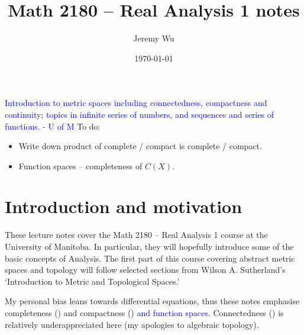\documentclass[12pt]{book}
\title{Math 2180 -- Real Analysis 1 notes}
\author{Jeremy Wu}
\date{\today}
\theoremstyle{remark}
\theoremstyle{definition}
\begin{document}
	\maketitle
	
	\textcolor{blue}{Introduction to metric spaces including connectedness, compactness and continuity; topics in infinite series of numbers, and sequences and series of functions. - U of M}
	To do:
	\begin{itemize}
		\item Write down product of complete / compact is complete / compact.
		\item Function spaces -- completeness of $C(X)$.
	\end{itemize}
	
	\tableofcontents
	
	\pagestyle{fancy}
	\section{Introduction and motivation}
	\label{sec:intro}
	These lecture notes cover the Math 2180 -- Real Analysis 1 course at the University of Manitoba. In particular, they will hopefully introduce some of the basic concepts of Analysis. The first part of this course covering abstract metric spaces and topology will follow selected sections from Wilson A. Sutherland's `Introduction to Metric and Topological Spaces.'
	
	My personal bias leans towards differential equations, thus these notes emphasise completeness () and compactness () \textcolor{blue}{and function spaces}. Connectedness () is relatively underappreciated here (my apologies to algebraic topology).
	
\end{document}

